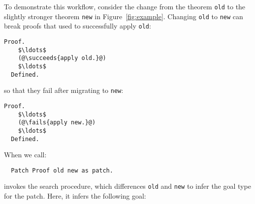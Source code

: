 \begin{figure*}
\begin{minipage}{0.50\textwidth}
\lstset{language=coq, aboveskip=0pt, belowskip=0pt}






\end{minipage}
\hfill
\begin{minipage}{0.48\textwidth}
\lstset{language=coq, aboveskip=0pt, belowskip=0pt}






\end{minipage}
\caption{Two proofs with different conclusions (top) and the
corresponding proof terms (bottom) with relevant type information. We highlight the change in theorem conclusion and
the difference in terms that corresponds to a patch.}
\label{fig:example}
\end{figure*}

To demonstrate this workflow, consider the change from the theorem \lstinline{old} to the slightly stronger theorem \lstinline{new} in Figure~\ref{fig:example}.
Changing \lstinline{old} to \lstinline{new} can break proofs that used to successfully apply \lstinline{old}:

\begin{lstlisting}[language=coq]
  Proof.
    $\ldots$
    (@\succeeds{apply old.}@)
    $\ldots$
  Defined.
\end{lstlisting}
so that they fail after migrating to \lstinline{new}:

\begin{lstlisting}[language=coq]
  Proof.
    $\ldots$
    (@\fails{apply new.}@)
    $\ldots$
  Defined.
\end{lstlisting}
When we call:

\begin{lstlisting}
  Patch Proof old new as patch.
\end{lstlisting}
\sysname invokes the search procedure, which differences \lstinline{old} and \lstinline{new} to infer the goal type for the patch.
Here, it infers the following goal:

